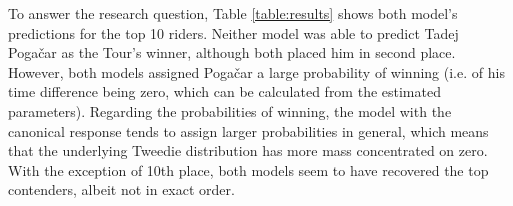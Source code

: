 \documentclass[aos,preprint]{imsart}
\begin{document}
To answer the research question, Table \ref{table:results} shows both model's predictions for the top 10 riders. Neither model was able to predict Tadej Pogačar as the Tour's winner, although both placed him in second place. However, both  models assigned Pogačar a large probability of winning (i.e. of his time difference being zero, which can be calculated from the estimated parameters). Regarding the probabilities of winning, the model with the canonical response tends to assign larger probabilities in general, which means that the underlying Tweedie distribution has more mass concentrated on zero. With the exception of 10th place, both models seem to have recovered the top contenders, albeit not in exact order. \\


\end{document}

